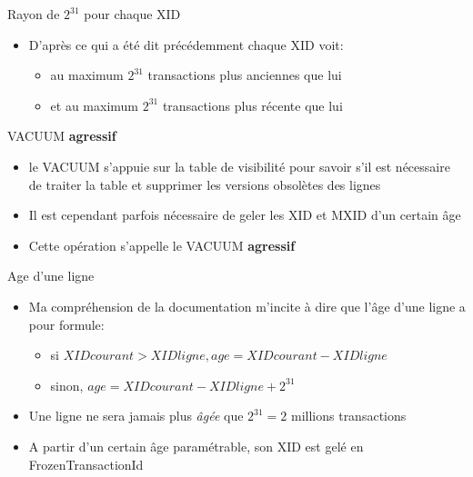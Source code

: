
\begin{frame}{Rayon de $2^{31}$ pour chaque XID}

\begin{itemize}
   \item D'après ce qui a été dit précédemment chaque XID voit:
   \begin{itemize}
      \item au maximum $2^{31}$ transactions plus anciennes que lui
      \item et au maximum $2^{31}$ transactions plus récente que lui
   \end{itemize}
\end{itemize}

\end{frame}


\begin{frame}{VACUUM \textbf{agressif}}

\begin{itemize}
   \item le VACUUM s'appuie sur la table de visibilité pour savoir s'il est nécessaire de traiter la table et supprimer les versions obsolètes des lignes
   \item Il est cependant parfois nécessaire de geler les XID et MXID d'un certain âge
   \item Cette opération s'appelle le VACUUM \textbf{agressif}
\end{itemize}

\end{frame}


\begin{frame}{Age d'une ligne}

\begin{itemize}
   \item Ma compréhension de la documentation m'incite à dire que l'âge d'une ligne a pour formule:
      \begin{itemize}
      \item si $XID courant > XID ligne, age = XID courant - XID ligne$
      \item sinon, $age = XID courant - XID ligne + 2^{31}$
      \end{itemize}
   \item Une ligne ne sera jamais plus \textit{âgée} que $2^{31} = 2$ millions transactions
   \item A partir d'un certain âge paramétrable, son XID est gelé en FrozenTransactionId
\end{itemize}

\end{frame}

